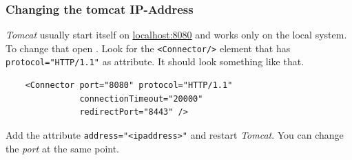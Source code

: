 \documentclass[10pt]{article}
\begin{document}
\subsubsection{Changing the tomcat IP-Address} \emph{Tomcat} usually start itself on \href{http://localhost:8080/}{localhost:8080} and works only on the local system. To change that open . Look for the \texttt{<Connector/>} element that has \texttt{protocol="HTTP/1.1"} as attribute. It should look something like that.
\begin{lstlisting}
    <Connector port="8080" protocol="HTTP/1.1"
               connectionTimeout="20000"
               redirectPort="8443" />
\end{lstlisting}
Add the attribute \texttt{address="<ipaddress>"} and restart \emph{Tomcat}. You can change the \emph{port} at the same point.
\end{document}
